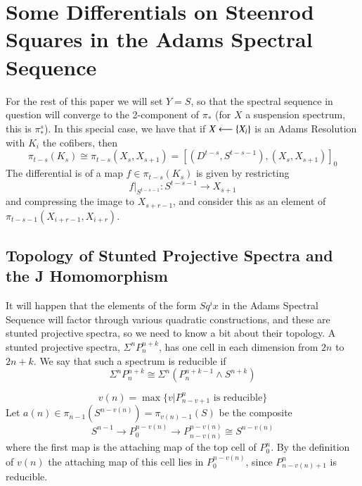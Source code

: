 \section{Some Differentials on Steenrod Squares in the Adams Spectral Sequence}

For the rest of this paper we will set $Y=S$, so that the spectral sequence in question will converge to the 2-component of $\pi_*$ (for $X$ a suspension spectrum, this is $\pi_*^s$).  In this special case, we have that if $X\longleftarrow \{X_i\}$ is an Adams Resolution with $K_i$ the cofibers, then 
\[\pi_{t-s}(K_s)\cong \pi_{t-s}(X_s,X_{s+1}) = [(D^{t-s},S^{t-s-1}),(X_s,X_{s+1})]_0\]
The differential is of a map $f\in \pi_{t-s}(K_s)$ is given by restricting 
\[f|_{S^{t-s-1}}:S^{t-s-1}\to X_{s+1}\]
 and compressing the image to $X_{s+r-1}$, and consider this as an element of $\pi_{t-s-1}(X_{i+r-1},X_{i+r})$. 


\subsection{Topology of Stunted Projective Spectra and the J Homomorphism}

It will happen that the elements of the form $Sq^ix$ in the Adams Spectral Sequence will factor through various quadratic constructions, and these are stunted projective spectra, so we need to know a bit about their topology.
A stunted projective spectra,  $\Sigma^nP^{n+k}_n$, has one cell in each dimension from $2n$ to $2n+k$.  
We say that such a spectrum is reducible if
\[\Sigma^n P^{n+k}_n \cong \Sigma^n(P^{n+k-1}_n\wedge S^{n+k})\]
\begin{Def}
  \[v(n) = \max\{v|P^n_{n-v+1}\mbox{ is reducible}\}\]
  Let $a(n) \in \pi_{n-1}(S^{n-v(n)})=\pi_{v(n)-1}(S)$ be the composite
  \[S^{n-1}\to P^{n-v(n)}_0\to P^{n-v(n)}_{n-v(n)}\cong S^{n-v(n)}\]
  where the first map is the attaching map of the top cell of $P^n_0$.
  By the definition of $v(n)$ the attaching map of this cell lies in $P_0^{n-v(n)}$, since $P^n_{n-v(n)+1}$ is reducible.  
\end{Def}

